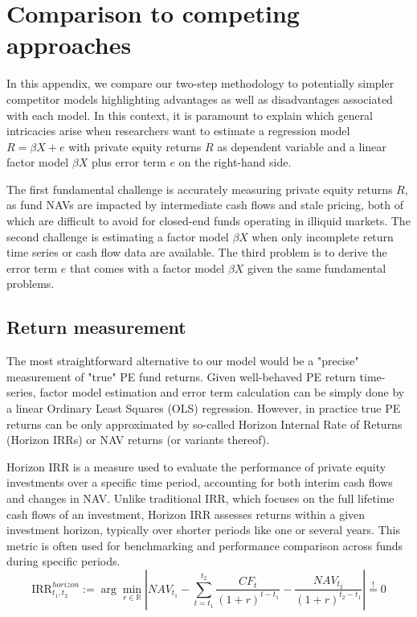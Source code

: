 \clearpage


\section{Comparison to competing approaches}
\label{sec:comparison}

In this appendix, we compare our two-step methodology to potentially simpler competitor models highlighting advantages as well as disadvantages associated with each model.
In this context, it is paramount to explain which general intricacies arise when researchers want to estimate a regression model $R = \beta X + e$ with private equity returns $R$ as dependent variable and a linear factor model $\beta X$ plus error term $e$ on the right-hand side.

The first fundamental challenge is accurately measuring private equity returns $R$, as fund NAVs are impacted by intermediate cash flows and stale pricing, both of which are difficult to avoid for closed-end funds operating in illiquid markets. 
The second challenge is estimating a factor model $\beta X$ when only incomplete return time series or cash flow data are available.
The third problem is to derive the error term $e$ that comes with a factor model $\beta X$ given the same fundamental problems.


\subsection{Return measurement}


The most straightforward alternative to our model would be a "precise" measurement of "true" PE fund returns.
Given well-behaved PE return time-series, factor model estimation and error term calculation can be simply done by a linear Ordinary Least Squares (OLS) regression.
However, in practice true PE returns can be only approximated by so-called Horizon Internal Rate of Returns (Horizon IRRs) or NAV returns (or variants thereof).

Horizon IRR is a measure used to evaluate the performance of private equity investments over a specific time period, accounting for both interim cash flows and changes in NAV.
Unlike traditional IRR, which focuses on the full lifetime cash flows of an investment, Horizon IRR assesses returns within a given investment horizon, typically over shorter periods like one or several years. 
This metric is often used for benchmarking and performance comparison across funds during specific periods.
\[
\mathrm{IRR}_{t_1,t_2}^{horizon} := \arg \min_{r \in \mathbb{R}} 
\left| 
{NAV}_{t_1} -
\sum_{t=t_1}^{t_2} \frac{{CF}_t}{(1 + r)^{t-t_1}} 
- \frac{{NAV}_{t_2}}{(1 + r)^{t_2-t_1}}
\right|
\stackrel{!}{=} 0
\]


